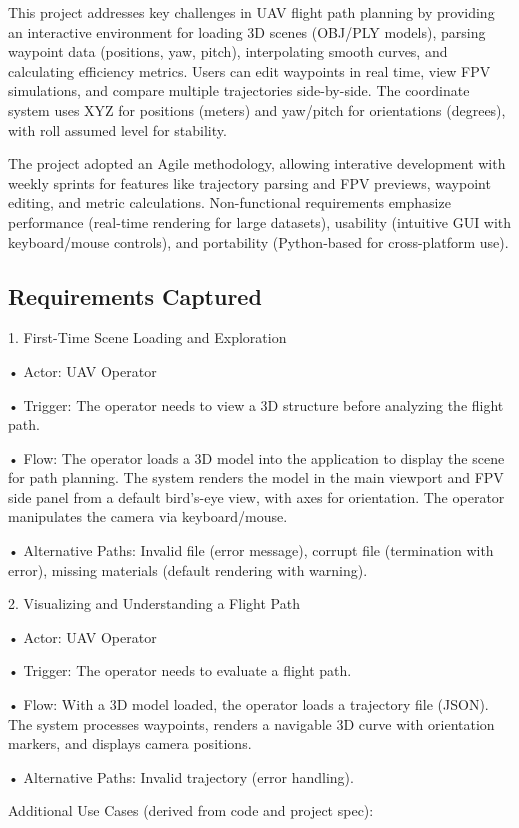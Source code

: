 \documentclass[11pt,a4paper]{article}
\begin{document}
This project addresses key challenges in UAV flight path planning by providing an interactive environment for loading 3D scenes (OBJ/PLY models), parsing waypoint data (positions, yaw, pitch), interpolating smooth curves, and calculating efficiency metrics. Users can edit waypoints in real time, view FPV simulations, and compare multiple trajectories side-by-side. The coordinate system uses XYZ for positions (meters) and yaw/pitch for orientations (degrees), with roll assumed level for stability.

The project adopted an Agile methodology, allowing interative development with weekly  sprints for features like trajectory parsing and FPV previews, waypoint editing, and metric calculations. Non-functional requirements emphasize performance (real-time rendering for large datasets), usability (intuitive GUI with keyboard/mouse controls), and portability (Python-based for cross-platform use).

\subsection{Requirements Captured}

1. First-Time Scene Loading and Exploration

• Actor: UAV Operator

• Trigger: The operator needs to view a 3D structure before analyzing
the flight path.

• Flow: The operator loads a 3D model into the application to display the scene for path planning. The system renders the model in the main viewport and FPV side panel from a default bird's-eye view, with axes for orientation. The operator manipulates the camera via keyboard/mouse.

• Alternative Paths: Invalid file (error message), corrupt file (termination with error), missing materials (default rendering with warning).

2. Visualizing and Understanding a Flight Path

• Actor: UAV Operator

• Trigger: The operator needs to evaluate a flight path.

• Flow: With a 3D model loaded, the operator loads a trajectory file (JSON). The system processes waypoints, renders a navigable 3D curve with orientation markers, and displays camera positions.

• Alternative Paths: Invalid trajectory (error handling).

Additional Use Cases (derived from code and project spec):
\end{document}
